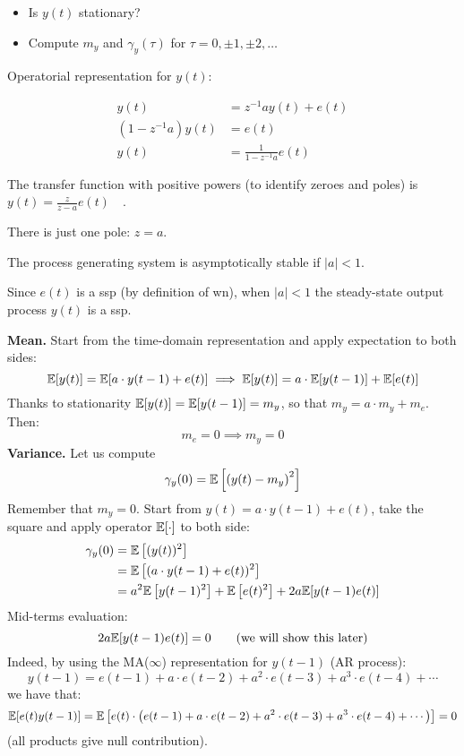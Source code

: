 \begin{itemize}
	\item Is $y(t)$ stationary?
	\item Compute $m_{y}$ and $\gamma_{y}(\tau)$ for $\tau=0, \pm 1, \pm 2, \ldots$
\end{itemize}

Operatorial representation for $y(t)$:

\begin{align*}
	y(t)&=z^{-1} a y(t)+e(t) \\
	\left(1-z^{-1} a\right) y(t)&=e(t) \\
	y(t)&=\frac{1}{1-z^{-1} a} e(t)
\end{align*}

The transfer function with positive powers (to identify zeroes and poles) is $y(t)=\frac{z}{z-a} e(t) \quad$.

There is just one pole: $z=a .$

The process generating system is asymptotically stable if $|a| <1$. 

Since $e(t)$ is a \gls{ssp} (by definition of \gls{wn}), when $|a| <1$ the steady-state output process $y(t)$ is a \gls{ssp}.

\textbf{Mean.}
Start from the time-domain representation and apply expectation to both sides:
\[
	\mathbb{E}[y(t)]=\mathbb{E}[a \cdot y(t-1)+e(t)] \implies \mathbb{E}[y(t)]=a \cdot \mathbb{E}[y(t-1)]+\mathbb{E}[e(t)]
\]
Thanks to stationarity $\mathbb{E}[y(t)]=\mathbb{E}[y(t-1)]=m_{y}$, so that $m_{y}=a \cdot m_{y}+m_{e}$.
Then:
$$
m_{e}=0 \implies  m_{y}=0
$$
\textbf{Variance.}
Let us compute
\[
	\gamma_{y}(0)=\mathbb{E}\left[\left(y(t)-m_{y}\right)^{2}\right]
\]
Remember that $m_{y}=0$. Start from $y(t)=a \cdot y(t-1)+e(t)$, take the square and apply operator $\mathbb{E}[\cdot]$ to both side:
\begin{align*}
	\gamma_{y}(0)&=\mathbb{E}\left[(y(t))^{2}\right]\\
	&=\mathbb{E}\left[(a \cdot y(t-1)+e(t))^{2}\right]\\
	&=a^{2} \mathbb{E}\left[y(t-1)^{2}\right]+\mathbb{E}\left[e(t)^{2}\right]+2 a \mathbb{E}[y(t-1) e(t)]\\
\end{align*}
Mid-terms evaluation:
\[
	2 a \mathbb{E}[y(t-1) e(t)]=0 \qquad \text{(we will show this later)}
\]
Indeed, by using the MA($\infty$) representation for $y(t-1)$ (AR process):
$$
y(t-1)=e(t-1)+a \cdot e(t-2)+a^{2} \cdot e(t-3)+a^{3} \cdot e(t-4)+\cdots
$$
we have that:
\[
	\mathbb{E}[e(t) y(t-1)]=\mathbb{E}\left[e(t) \cdot\left(e(t-1)+a \cdot e(t-2)+a^{2} \cdot e(t-3)+a^{3} \cdot e(t-4)+\cdots\right)\right]=0
\]
(all products give null contribution).



